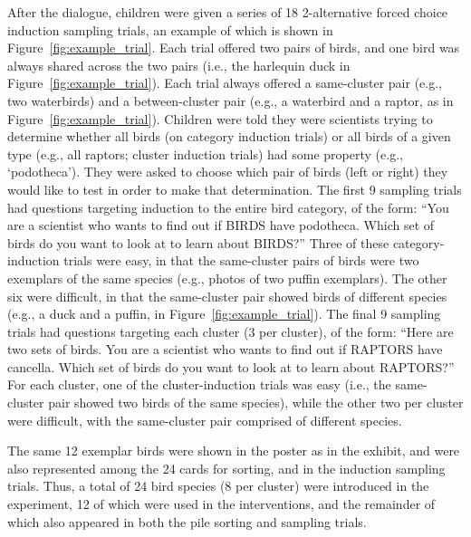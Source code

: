 \documentclass[10pt,letterpaper]{article}
\begin{document}
After the dialogue, children were given a series of 18 2-alternative forced choice induction sampling trials, an example of which is shown in Figure~\ref{fig:example_trial}.
Each trial offered two pairs of birds, and one bird was always shared across the two pairs (i.e., the harlequin duck in Figure~\ref{fig:example_trial}). Each trial always offered a same-cluster pair (e.g., two waterbirds) and a between-cluster pair (e.g., a waterbird and a raptor, as in Figure~\ref{fig:example_trial}).
Children were told they were scientists trying to determine whether all birds (on category induction trials) or all birds of a given type (e.g., all raptors; cluster induction trials) had some property (e.g., `podotheca'). They were asked to choose which pair of birds (left or right) they would like to test in order to make that determination.
The first 9 sampling trials had questions targeting induction to the entire bird category, of the form: ``You are a scientist who wants to find out if BIRDS have podotheca. Which set of birds do you want to look at to learn about BIRDS?''
Three of these category-induction trials were easy, in that the same-cluster pairs of birds were two exemplars of the same species (e.g., photos of two puffin exemplars). The other six were difficult, in that the same-cluster pair showed birds of different species (e.g., a duck and a puffin, in Figure~\ref{fig:example_trial}).
The final 9 sampling trials had questions targeting each cluster (3 per cluster), of the form: ``Here are two sets of birds. You are a scientist who wants to find out if RAPTORS have cancella. Which set of birds do you want to look at to learn about RAPTORS?''
For each cluster, one of the cluster-induction trials was easy (i.e., the same-cluster pair showed two birds of the same species), while the other two per cluster were difficult, with the same-cluster pair comprised of different species.

The same 12 exemplar birds were shown in the poster as in the exhibit, and were also represented among the 24 cards for sorting, and in the induction sampling trials.
Thus, a total of 24 bird species (8 per cluster) were introduced in the experiment, 12 of which were used in the interventions, and the remainder of which also appeared in both the pile sorting and sampling trials. 
\end{document}
